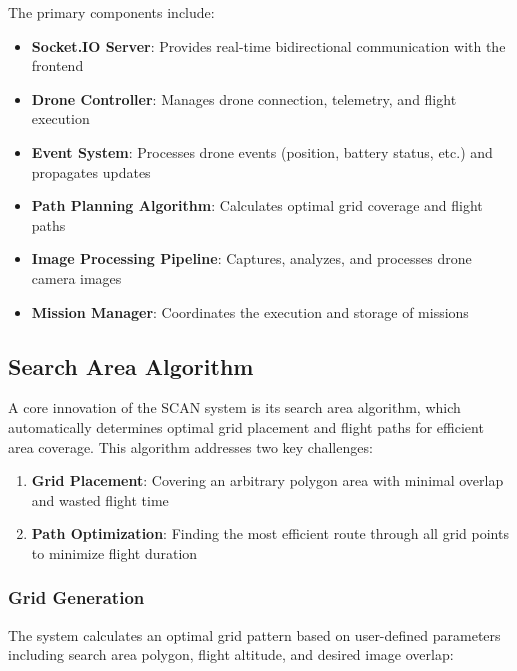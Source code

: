     The primary components include:
    
    \begin{itemize}
        \item \textbf{Socket.IO Server}: Provides real-time bidirectional communication with the frontend
        \item \textbf{Drone Controller}: Manages drone connection, telemetry, and flight execution
        \item \textbf{Event System}: Processes drone events (position, battery status, etc.) and propagates updates
        \item \textbf{Path Planning Algorithm}: Calculates optimal grid coverage and flight paths
        \item \textbf{Image Processing Pipeline}: Captures, analyzes, and processes drone camera images
        \item \textbf{Mission Manager}: Coordinates the execution and storage of missions
    \end{itemize}
    
    \subsection{Search Area Algorithm}
    
    A core innovation of the SCAN system is its search area algorithm, which automatically determines optimal grid placement and flight paths for efficient area coverage. This algorithm addresses two key challenges:
    
    \begin{enumerate}
        \item \textbf{Grid Placement}: Covering an arbitrary polygon area with minimal overlap and wasted flight time
        \item \textbf{Path Optimization}: Finding the most efficient route through all grid points to minimize flight duration
    \end{enumerate}
    
    \subsubsection{Grid Generation}
    
    The system calculates an optimal grid pattern based on user-defined parameters including search area polygon, flight altitude, and desired image overlap:
    
